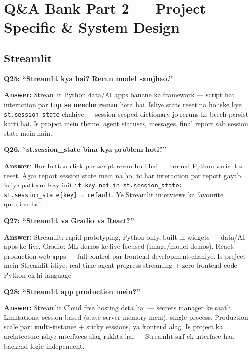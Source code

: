 \newpage

\section{Q\&A Bank Part 2 --- Project Specific \& System Design}

\subsection{Streamlit}

\begin{interviewbox}
\textbf{Q25: ``Streamlit kya hai? Rerun model samjhao.''}

\textbf{Answer:} Streamlit Python data/AI apps banane ka framework --- script har interaction par \textbf{top se neeche rerun} hota hai. Isliye state reset na ho iske liye \texttt{st.session\_state} chahiye --- session-scoped dictionary jo reruns ke beech persist karti hai. Is project mein theme, agent statuses, messages, final report sab session state mein hain.
\end{interviewbox}

\begin{interviewbox}
\textbf{Q26: ``st.session\_state bina kya problem hoti?''}

\textbf{Answer:} Har button click par script rerun hoti hai --- normal Python variables reset. Agar report session state mein na ho, to har interaction par report gayab. Isliye pattern: lazy init \texttt{if key not in st.session\_state: st.session\_state[key] = default}. Ye Streamlit interviews ka favourite question hai.
\end{interviewbox}

\begin{interviewbox}
\textbf{Q27: ``Streamlit vs Gradio vs React?''}

\textbf{Answer:} Streamlit: rapid prototyping, Python-only, built-in widgets --- data/AI apps ke liye. Gradio: ML demos ke liye focused (image/model demos). React: production web apps --- full control par frontend development chahiye. Is project mein Streamlit isliye: real-time agent progress streaming + zero frontend code + Python ek hi language.
\end{interviewbox}

\begin{interviewbox}
\textbf{Q28: ``Streamlit app production mein?''}

\textbf{Answer:} Streamlit Cloud free hosting deta hai --- secrets manager ke saath. Limitations: session-based (state server memory mein), single-process. Production scale par: multi-instance + sticky sessions, ya frontend alag. Is project ka architecture isliye interfaces alag rakhta hai --- Streamlit sirf ek interface hai, backend logic independent.
\end{interviewbox}

